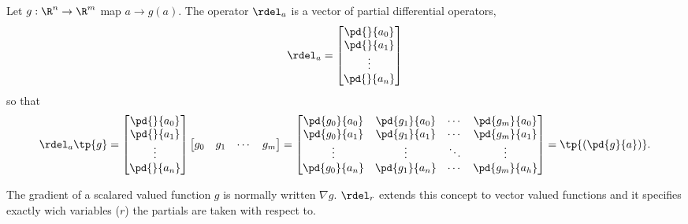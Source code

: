 \begin{df}
    Let $g:\R^n\to \R^m$ map $a \to g(a)$.
    The operator $\rdel_a$ is a vector of partial differential operators,
    \begin{equation}
        \rdel_a = \begin{bmatrix}
            \pd{}{a_0} \\
            \pd{}{a_1} \\
            \vdots \\
            \pd{}{a_n}
        \end{bmatrix}
    \end{equation}
    so that
    \begin{equation}
        \rdel_a \tp{g} = \begin{bmatrix}
            \pd{}{a_0} \\
            \pd{}{a_1} \\
            \vdots \\
            \pd{}{a_n}
        \end{bmatrix} \begin{bmatrix}
            g_0 & g_1 & \cdots & g_m
        \end{bmatrix}
        = \begin{bmatrix}
            \pd{g_0}{a_0} & \pd{g_1}{a_0} & \cdots & \pd{g_m}{a_0} \\
            \pd{g_0}{a_1} & \pd{g_1}{a_1} & \cdots & \pd{g_m}{a_1} \\
            \vdots & \vdots & \ddots & \vdots \\
            \pd{g_0}{a_n} & \pd{g_1}{a_n} & \cdots & \pd{g_m}{a_h}
        \end{bmatrix}
        =\tp{\left( \pd{g}{a} \right)}.
    \end{equation}
\end{df}

\begin{rk}
The gradient of a scalared valued function $g$ is normally
written $\nabla g$. $\rdel_r$ extends this concept to vector valued
functions and it specifies exactly wich variables ($r$) the partials
are taken with respect to.
\end{rk}


